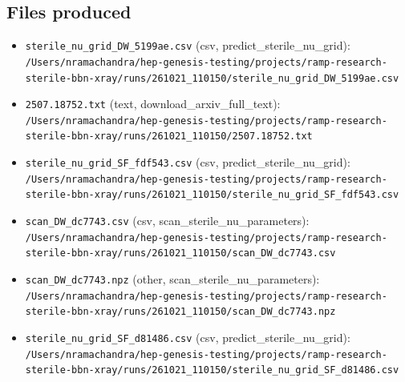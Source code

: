\documentclass[11pt,a4paper]{article}
\begin{document}
\subsection{Files produced}
\begin{itemize}
  \item \texttt{sterile\_\allowbreak{}nu\_\allowbreak{}grid\_\allowbreak{}DW\_\allowbreak{}5199ae.csv} (csv, predict\_sterile\_nu\_grid): \texttt{/\allowbreak{}Users/\allowbreak{}nramachandra/\allowbreak{}hep-genesis-testing/\allowbreak{}projects/\allowbreak{}ramp-research-sterile-bbn-xray/\allowbreak{}runs/\allowbreak{}261021\_\allowbreak{}110150/\allowbreak{}sterile\_\allowbreak{}nu\_\allowbreak{}grid\_\allowbreak{}DW\_\allowbreak{}5199ae.csv}
  \item \texttt{2507.18752.txt} (text, download\_arxiv\_full\_text): \texttt{/\allowbreak{}Users/\allowbreak{}nramachandra/\allowbreak{}hep-genesis-testing/\allowbreak{}projects/\allowbreak{}ramp-research-sterile-bbn-xray/\allowbreak{}runs/\allowbreak{}261021\_\allowbreak{}110150/\allowbreak{}2507.18752.txt}
  \item \texttt{sterile\_\allowbreak{}nu\_\allowbreak{}grid\_\allowbreak{}SF\_\allowbreak{}fdf543.csv} (csv, predict\_sterile\_nu\_grid): \texttt{/\allowbreak{}Users/\allowbreak{}nramachandra/\allowbreak{}hep-genesis-testing/\allowbreak{}projects/\allowbreak{}ramp-research-sterile-bbn-xray/\allowbreak{}runs/\allowbreak{}261021\_\allowbreak{}110150/\allowbreak{}sterile\_\allowbreak{}nu\_\allowbreak{}grid\_\allowbreak{}SF\_\allowbreak{}fdf543.csv}
  \item \texttt{scan\_\allowbreak{}DW\_\allowbreak{}dc7743.csv} (csv, scan\_sterile\_nu\_parameters): \texttt{/\allowbreak{}Users/\allowbreak{}nramachandra/\allowbreak{}hep-genesis-testing/\allowbreak{}projects/\allowbreak{}ramp-research-sterile-bbn-xray/\allowbreak{}runs/\allowbreak{}261021\_\allowbreak{}110150/\allowbreak{}scan\_\allowbreak{}DW\_\allowbreak{}dc7743.csv}
  \item \texttt{scan\_\allowbreak{}DW\_\allowbreak{}dc7743.npz} (other, scan\_sterile\_nu\_parameters): \texttt{/\allowbreak{}Users/\allowbreak{}nramachandra/\allowbreak{}hep-genesis-testing/\allowbreak{}projects/\allowbreak{}ramp-research-sterile-bbn-xray/\allowbreak{}runs/\allowbreak{}261021\_\allowbreak{}110150/\allowbreak{}scan\_\allowbreak{}DW\_\allowbreak{}dc7743.npz}
  \item \texttt{sterile\_\allowbreak{}nu\_\allowbreak{}grid\_\allowbreak{}SF\_\allowbreak{}d81486.csv} (csv, predict\_sterile\_nu\_grid): \texttt{/\allowbreak{}Users/\allowbreak{}nramachandra/\allowbreak{}hep-genesis-testing/\allowbreak{}projects/\allowbreak{}ramp-research-sterile-bbn-xray/\allowbreak{}runs/\allowbreak{}261021\_\allowbreak{}110150/\allowbreak{}sterile\_\allowbreak{}nu\_\allowbreak{}grid\_\allowbreak{}SF\_\allowbreak{}d81486.csv}

\end{itemize}
\end{document}
